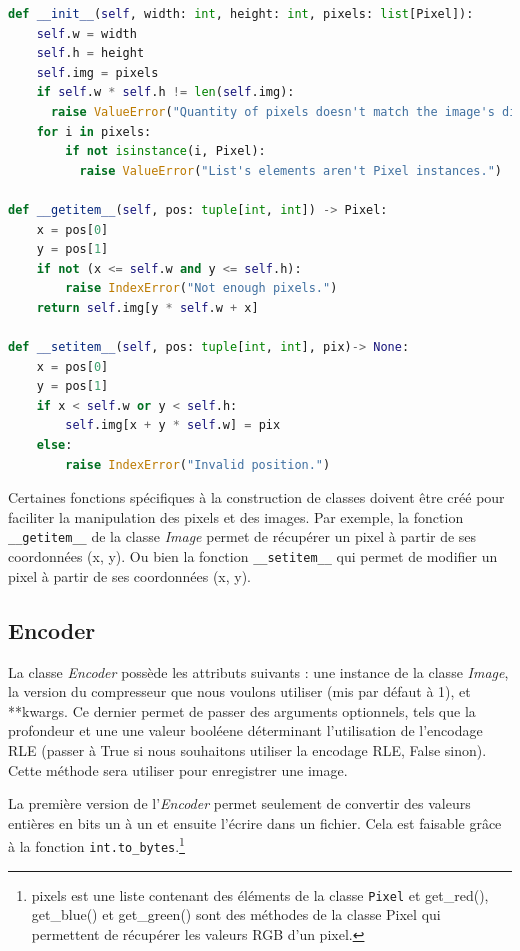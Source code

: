 \documentclass[utf8]{article}
\begin{document}
\begin{lstlisting}[language=Python, basicstyle=\small]
 def __init__(self, width: int, height: int, pixels: list[Pixel]):
    self.w = width
    self.h = height
    self.img = pixels
    if self.w * self.h != len(self.img):
      raise ValueError("Quantity of pixels doesn't match the image's dimension.")
    for i in pixels:
        if not isinstance(i, Pixel):
		  raise ValueError("List's elements aren't Pixel instances.")

def __getitem__(self, pos: tuple[int, int]) -> Pixel:
    x = pos[0]
    y = pos[1]
    if not (x <= self.w and y <= self.h):
        raise IndexError("Not enough pixels.")
    return self.img[y * self.w + x]

def __setitem__(self, pos: tuple[int, int], pix)-> None:
    x = pos[0]
    y = pos[1]
    if x < self.w or y < self.h:
        self.img[x + y * self.w] = pix
    else:
        raise IndexError("Invalid position.")

\end{lstlisting}
Certaines fonctions spécifiques à la construction de classes doivent être créé pour faciliter la manipulation des pixels et des images. Par exemple, la fonction \texttt{__getitem__} de la classe \textit{Image} permet de récupérer un pixel à partir de ses coordonnées (x, y).
Ou bien la fonction \texttt{__setitem__} qui permet de modifier un pixel à partir de ses coordonnées (x, y).


\subsection{Encoder}
La classe \textit{Encoder} possède les attributs suivants : une instance de la classe \textit{Image}, la version du compresseur que nous  voulons utiliser (mis par défaut à 1), et **kwargs. Ce dernier permet de passer des arguments optionnels, tels que la profondeur et une une valeur booléene déterminant l'utilisation de l'encodage RLE (passer à True si nous souhaitons utiliser la encodage RLE, False sinon). Cette méthode sera utiliser pour enregistrer une image.

La première version de l'\textit{Encoder} permet seulement de convertir des valeurs entières en bits un à un et ensuite l'écrire dans un fichier. Cela est faisable grâce à la fonction \texttt{int.to_bytes}.\footnote{pixels est une liste contenant des éléments de la classe \texttt{Pixel} et get_red(), get_blue() et get_green() sont des méthodes de la classe Pixel qui permettent de récupérer les valeurs RGB d'un pixel.}
\end{document}
